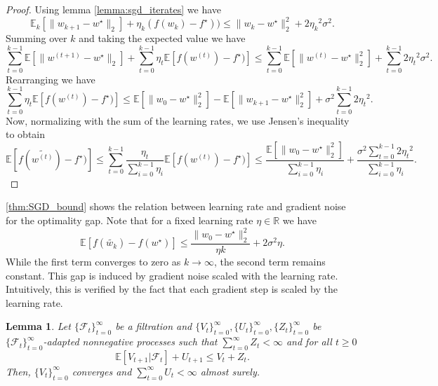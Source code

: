 \documentclass[12pt]{article}
\newtheorem{lemma}[lemma]{Lemma}
\theoremstyle{definition}
\numberwithin{equation}{section}
\newcommand{\R}{\mathbb{R}}
\newcommand{\E}{\mathbb{E}}
\newcommand{\CF}{\mathcal{F}}
\newcommand{\ev}[1]{\mathbb{E}\left[{#1}\right]}
\newcommand{\norm}[1]{\lVert{#1}\rVert_2}
\begin{document}
\begin{proof}
  Using lemma \autoref{lemma:sgd_iterates} we have
  \begin{equation*}
    \E_k[\norm{w_{k+1} - w^\star}] + \eta_k (f(w_{k}) - f^\star)) \leq \norm{w_{k} - w^\star}^2 + 2{\eta_k}^2\sigma^2.
  \end{equation*}
  Summing over $k$ and taking the expected value we have
  \begin{equation*}
    \sum_{t=0}^{k-1}\ev{\norm{w^{(t+1)} - w^\star}} + \sum_{t=0}^{k-1} \eta_t \ev{f(w^{(t)}) - f^\star)} \leq \sum_{t=0}^{k-1} \ev{\norm{w^{(t)} - w^\star}^2} + \sum_{t=0}^{k-1} 2{\eta_t}^2\sigma^2.
  \end{equation*}
  Rearranging we have
  \begin{equation*}
    \sum_{t=0}^{k-1} \eta_t \ev{f(w^{(t)}) - f^\star)} \leq \ev{\norm{w_{0} - w^\star}^2} - \ev{\norm{w_{k+1} - w^\star}^2} + \sigma^2\sum_{t=0}^{k-1} 2{\eta_t}^2.
  \end{equation*}
  Now, normalizing with the sum of the learning rates, we use Jensen's inequality to obtain
  \begin{equation*}
    \ev{f(\widetilde{w^{(t)}}) - f^\star)} \leq \sum_{t=0}^{k-1} \frac{\eta_t}{\sum_{i=0}^{k-1}\eta_i} \ev{f(w^{(t)}) - f^\star)} \leq \frac{\ev{\norm{w_{0} - w^\star}^2}}{\sum_{i=0}^{k-1}\eta_i} + \frac{\sigma^2\sum_{t=0}^{k-1} 2{\eta_t}^2}{\sum_{i=0}^{k-1}\eta_i}.
  \end{equation*}
\end{proof}

\autoref{thm:SGD_bound} shows the relation between learning rate and gradient noise for the optimality gap. Note that for a fixed learning rate $\eta \in \R$ we have
\begin{equation*}
  \E [f(\widetilde{w_{k}}) - f(w^\star)] \leq \frac{\norm{w_{0} - w^\star}^2}{\eta k} + 2 \sigma^2 \eta.
\end{equation*}
While the first term converges to zero as $k \rightarrow \infty$, the second term remains constant. This gap is induced by gradient noise scaled with the learning rate. Intuitively, this is verified by the fact that each gradient step is scaled by the learning rate.
\begin{lemma}
  Let $\{\CF_t\}_{t=0}^\infty$ be a filtration and $\{V_t\}_{t=0}^\infty, \{U_t\}_{t=0}^\infty, \{Z_t\}_{t=0}^\infty$ be $\{\CF_t\}_{t=0}^\infty$-adapted nonnegative processes such that $\sum_{t=0}^\infty Z_t < \infty$ and for all $t \geq 0$
  \begin{equation*}
    \ev{V_{t+1}|\CF_t} + U_{t+1} \leq V_t + Z_t.
  \end{equation*}
  Then, $\{V_t\}_{t=0}^\infty$ converges and $\sum_{t=0}^\infty U_t < \infty$ almost surely.
\end{lemma}
\end{document}
